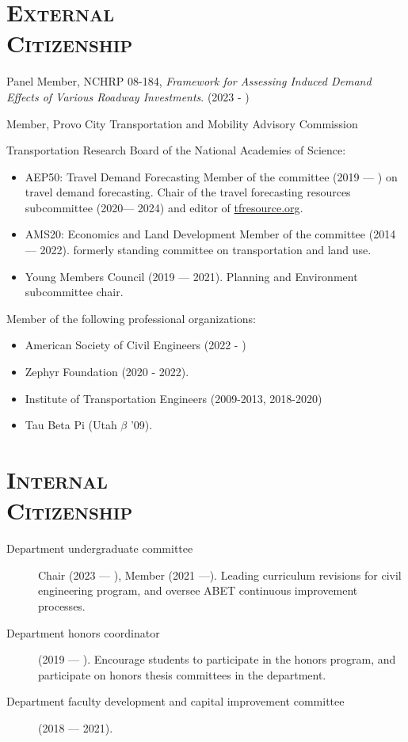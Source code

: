 \documentclass[margin,line]{res}
\newcommand{\secfont}{\scshape }
\begin{document}
\begin{resume}
\noindent\makebox[\linewidth]{\rule{\linewidth}{0.4pt}}
\section{\secfont External \\ Citizenship}



Panel Member, NCHRP 08-184, \textit{Framework for Assessing Induced Demand Effects of Various Roadway Investments}. (2023 - )

Member, Provo City Transportation and Mobility Advisory Commission

Transportation Research Board of the National Academies of Science:

\begin{itemize}
  \item AEP50: Travel Demand Forecasting Member of the committee (2019 --- ) on
  travel demand forecasting. Chair of the travel forecasting resources
  subcommittee (2020--- 2024) and editor of \url{tfresource.org}.
  \item AMS20: Economics and Land Development Member of the committee (2014
  --- 2022). formerly standing committee on transportation and land use.
  \item Young Members Council (2019 --- 2021). Planning and Environment subcommittee
  chair.
\end{itemize}



Member of the following professional organizations:

\begin{itemize}
  \item American Society of Civil Engineers (2022 - )
  \item Zephyr Foundation (2020 - 2022).
  \item Institute of Transportation Engineers (2009-2013, 2018-2020)
  \item Tau Beta Pi (Utah $\beta$ '09).
\end{itemize}


\noindent\makebox[\linewidth]{\rule{\linewidth}{0.4pt}}
\section{\secfont Internal \\ Citizenship}
\begin{description}
  \item[Department undergraduate committee] Chair (2023 --- ), Member (2021 ---). 
  Leading curriculum revisions for civil engineering program, and oversee
  ABET continuous improvement processes.
  \item[Department honors coordinator] (2019 --- ). Encourage students to participate
  in the honors program, and participate on honors thesis committees in the
  department.
  \item[Department faculty development and capital improvement committee] (2018 --- 2021).
\end{description}



\end{resume}
\end{document}

